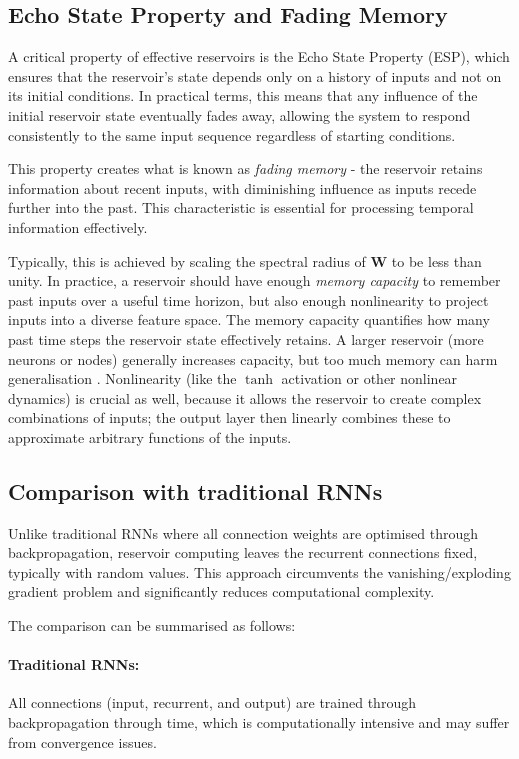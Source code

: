 \documentclass[numbered]{ivt-style/standard}
\begin{document}
\subsection{Echo State Property and Fading Memory}

A critical property of effective reservoirs is the Echo State Property (ESP), which ensures that the reservoir's state depends only on a history of inputs and not on its initial conditions. In practical terms, this means that any influence of the initial reservoir state eventually fades away, allowing the system to respond consistently to the same input sequence regardless of starting conditions.

This property creates what is known as \textit{fading memory} - the reservoir retains information about recent inputs, with diminishing influence as inputs recede further into the past. This characteristic is essential for processing temporal information effectively.

Typically, this is achieved by scaling the spectral radius of $\mathbf{W}$ to be less than unity.  In practice, a reservoir should have enough \emph{memory capacity} to remember past inputs over a useful time horizon, but also enough nonlinearity to project inputs into a diverse feature space.  The memory capacity quantifies how many past time steps the reservoir state effectively retains.  A larger reservoir (more neurons or nodes) generally increases capacity, but too much memory can harm generalisation \cite{article_RC_intro}.  Nonlinearity (like the $\tanh$ activation or other nonlinear dynamics) is crucial as well, because it allows the reservoir to create complex combinations of inputs; the output layer then linearly combines these to approximate arbitrary functions of the inputs.


\subsection{Comparison with traditional RNNs}

Unlike traditional RNNs where all connection weights are optimised through backpropagation, reservoir computing leaves the recurrent connections fixed, typically with random values. This approach circumvents the vanishing/exploding gradient problem and significantly reduces computational complexity.

The comparison can be summarised as follows:

\paragraph{Traditional RNNs: }All connections (input, recurrent, and output) are trained through backpropagation through time, which is computationally intensive and may suffer from convergence issues.
\end{document}
